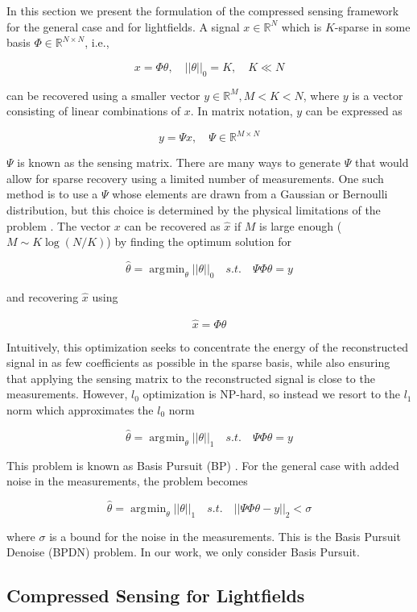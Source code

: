 \documentclass[10pt,twocolumn,letterpaper]{article}
\DeclareMathOperator*{\argmin}{\arg\!\min}
\begin{document}
In this section we present the formulation of the compressed sensing framework \cite{CSPaper} for the general case and for lightfields. A signal $x \in \mathbb{R}^N$ which is $K$-sparse in some basis $\Phi \in \mathbb{R}^{N\times N}$, i.e.,

\[ x = \Phi \theta, \quad ||\theta||_0 = K, \quad K \ll N\]

can be recovered using a smaller vector $y \in \mathbb{R}^M, M < K < N$, where $y$ is a vector consisting of linear combinations of $x$. In matrix notation, $y$ can be expressed as 

\[ y = \Psi x, \quad \Psi \in \mathbb{R}^{M \times N}\]

$\Psi$ is known as the sensing matrix. There are many ways to generate $\Psi$ that would allow for sparse recovery using a limited number of measurements. One such method is to use a $\Psi$ whose elements are drawn from a Gaussian or Bernoulli distribution, but this choice is determined by the physical limitations of the problem \cite{Rauhut11}. The vector $x$ can be recovered as $\hat{x}$ if $M$ is large enough ($M \sim K\log(N/K)$) by finding the optimum solution for 

\[ \hat{\theta} = \argmin_\theta ||\theta||_0 \quad s.t. \quad \Psi\Phi\theta = y\]

and recovering $\hat{x}$ using

\[ \hat{x} = \Phi \hat{\theta}\]

Intuitively, this optimization seeks to concentrate the energy of the reconstructed signal in as few coefficients as possible in the sparse basis, while also ensuring that applying the sensing matrix to the reconstructed signal is close to the measurements. However, $l_0$ optimization is NP-hard, so instead we resort to the $l_1$ norm which approximates the $l_0$ norm

\[ \hat{\theta} = \argmin_\theta ||\theta||_1 \quad s.t. \quad \Psi\Phi\theta = y\]

This problem is known as Basis Pursuit (BP) \cite{BasisPursuit1}. For the general case with added noise in the measurements, the problem becomes

\[ \hat{\theta} = \argmin_\theta ||\theta||_1 \quad s.t. \quad ||\Psi\Phi\theta - y||_2 < \sigma\]


where $\sigma$ is a bound for the noise in the measurements. This is the Basis Pursuit Denoise (BPDN) problem. In our work, we only consider Basis Pursuit.

\subsection{Compressed Sensing for Lightfields}
\end{document}

